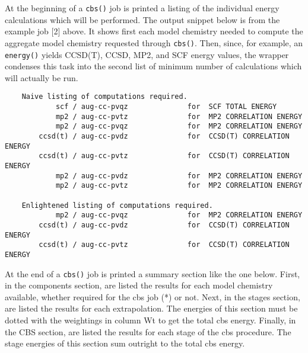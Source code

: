 
At the beginning of a \texttt{cbs()} job is printed a listing of the individual energy
calculations which will be performed. The output snippet below is from the example job [2]
above. It shows first each model chemistry
needed to compute the aggregate model chemistry requested through \texttt{cbs()}. Then,
since, for example, an \texttt{energy(\qq)} yields CCSD(T), CCSD, MP2, and SCF
energy values, the wrapper condenses this task into the second list of minimum number of
calculations which will actually be run.

\begin{verbatim}
    Naive listing of computations required.
            scf / aug-cc-pvqz              for  SCF TOTAL ENERGY
            mp2 / aug-cc-pvtz              for  MP2 CORRELATION ENERGY
            mp2 / aug-cc-pvqz              for  MP2 CORRELATION ENERGY
        ccsd(t) / aug-cc-pvdz              for  CCSD(T) CORRELATION ENERGY
        ccsd(t) / aug-cc-pvtz              for  CCSD(T) CORRELATION ENERGY
            mp2 / aug-cc-pvdz              for  MP2 CORRELATION ENERGY
            mp2 / aug-cc-pvtz              for  MP2 CORRELATION ENERGY

    Enlightened listing of computations required.
            mp2 / aug-cc-pvqz              for  MP2 CORRELATION ENERGY
        ccsd(t) / aug-cc-pvdz              for  CCSD(T) CORRELATION ENERGY
        ccsd(t) / aug-cc-pvtz              for  CCSD(T) CORRELATION ENERGY
\end{verbatim}

At the end of a \texttt{cbs()} job is printed a summary section like the one below. First,
in the components section, are listed the results for each model chemistry available, whether
required for the cbs job (*) or not. Next, in the stages section, are listed the results for
each extrapolation. The energies of this section must be dotted with the weightings in column Wt
to get the total cbs energy. Finally, in the CBS section, are listed the results for each stage
of the cbs procedure. The stage energies of this section sum outright to the total cbs energy.

